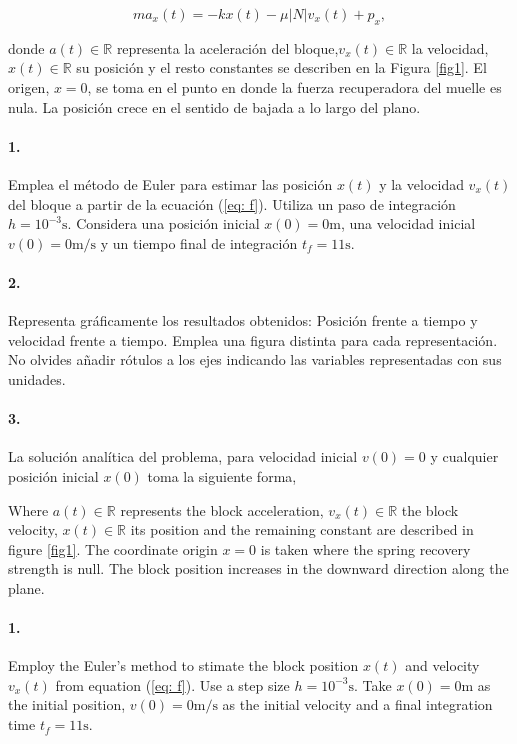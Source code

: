 \begin{equation}
	ma_{x}(t) = -kx(t) -\mu \lvert N \lvert v_x(t) + p_x, \label{eq: f}
\end{equation}
\begin{paracol}{2}
donde $a(t)\in\mathbb{R}$ representa la aceleración del bloque,$v_x(t) \in\mathbb{R}$ la velocidad, $x(t)\in\mathbb{R}$ su posición y el resto constantes se describen en la Figura \ref{fig1}. El origen, $x=0$, se toma en el punto en donde la fuerza recuperadora del muelle es nula. La posición crece en el sentido de bajada a lo largo del plano.

\paragraph{1.} \label{p1} Emplea el método de Euler para estimar las posición $x(t)$ y la velocidad $v_x(t)$ del bloque a partir de la ecuación (\ref{eq: f}). Utiliza un paso de integración $h =10^{-3}\text{s}$. Considera una posición inicial $x(0) =0\text{m}$, una velocidad inicial $v(0) = 0\text{m/s}$ y un tiempo final de integración $t_{f}=11\text{s}$.

\paragraph{2.} \label{p2} Representa gráficamente los resultados obtenidos: Posición frente a tiempo y velocidad frente a tiempo. Emplea una figura distinta para cada representación. No olvides añadir rótulos a los ejes indicando las variables representadas con sus unidades.

\paragraph{3.} La solución analítica del problema, para velocidad inicial $v(0)=0$ y cualquier posición inicial $x(0)$ toma la siguiente forma,

\switchcolumn
Where  $a(t)\in\mathbb{R}$ represents the block acceleration, $v_x(t) \in\mathbb{R}$ the block velocity, $x(t)\in\mathbb{R}$ its position and the remaining constant are described in figure \ref{fig1}. The coordinate origin $x=0$ is taken where the spring recovery strength is null. The block position increases in the downward direction along the plane.

\paragraph{1.} \label{p1} Employ the Euler's method to stimate the block position $x(t)$ and velocity $v_x(t)$ from equation (\ref{eq: f}). Use a step size $h = 10^{-3}\text{s}$. Take $x(0) = 0\text{m}$ as the initial position, $v(0) = 0\text{m/s}$ as the initial velocity and a final integration time $t_{f}=11\text{s}$.


\end{paracol}
